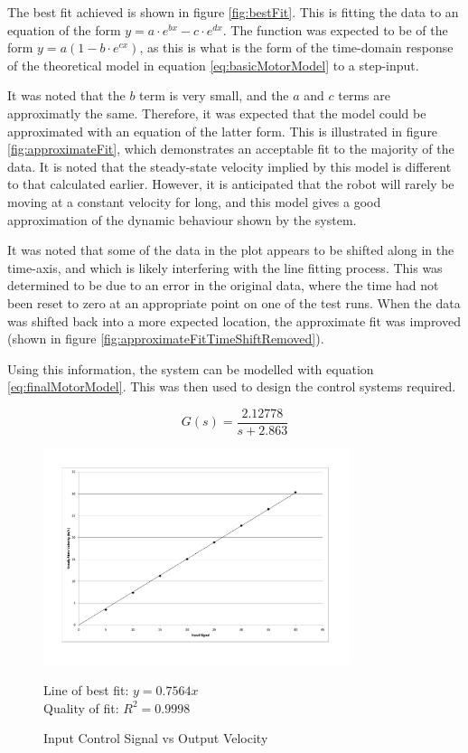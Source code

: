 \documentclass[10pt]{article} \usepackage[a4paper]{geometry}
\begin{document}
The best fit achieved is shown in figure \ref{fig:bestFit}.  This is fitting the
data to an equation of the form $y = a \cdot e^{bx} - c \cdot e^{dx} $.  The
function was expected to be of the form $y = a(1-b \cdot e^{cx})$, as this is
what is the form of the time-domain response of the theoretical model in
equation \ref{eq:basicMotorModel} to a step-input.

It was noted that the $b$ term is very small, and the $a$ and $c$ terms are
approximatly the same.  Therefore, it was expected that the model could be
approximated with an equation of the latter form.  This is illustrated in figure
\ref{fig:approximateFit}, which demonstrates an acceptable fit to the majority
of the data.  It is noted that the steady-state velocity implied by this model
is different to that calculated earlier.  However, it is anticipated that the
robot will rarely be moving at a constant velocity for long, and this model
gives a good approximation of the dynamic behaviour shown by the system.

It was noted that some of the data in the plot appears to be shifted along in
the time-axis, and which is likely interfering with the line fitting process.
This was determined to be due to an error in the original data, where the time
had not been reset to zero at an appropriate point on one of the test runs.
When the data was shifted back into a more expected location, the approximate
fit was improved (shown in figure \ref{fig:approximateFitTimeShiftRemoved}).

Using this information, the system can be modelled with equation
\ref{eq:finalMotorModel}.  This was then used to design the control systems
required.

\begin{equation}
 \label{eq:finalMotorModel}
 G\left(s\right) = \frac{2.12778}{s+2.863}
\end{equation}

\begin{figure}
 \centering
 \includegraphics[width=0.8\textwidth]{Images/input-signal-vs-output-speed}
 \caption{Input Control Signal vs Output Velocity}
 \label{fig:inputOutputVelocityGraph}

 Line of best fit: $y=0.7564x$ \\
 Quality of fit: $R^2 = 0.9998$
\end{figure}
\end{document}

